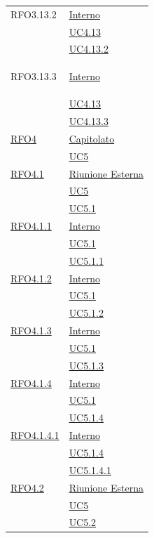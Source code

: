 \begin{longtable}{|>{\centering}m{5cm}|m{5cm}<{\centering}|}
\hypertarget{RFO3.13.2}{RFO3.13.2} & \hyperlink{Interno}{Interno}\\
&\hyperref[UC4.13]{UC4.13}\\
&\hyperref[UC4.13.2]{UC4.13.2}\\ \hline

\hypertarget{RFO3.13.3}{RFO3.13.3} & \hyperlink{Interno}{Interno}\\
&\hyperref[UC4.13]{UC4.13}\\
&\hyperref[UC4.13.3]{UC4.13.3}\\ \hline

\hyperlink{RFO4}{RFO4} & \hyperlink{Capitolato}{Capitolato}\\
& \hyperref[UC5]{UC5}\\ \hline

\hyperlink{RFO4.1}{RFO4.1} & \hyperlink{Riunione Esterna}{Riunione Esterna}\\
& \hyperref[UC5]{UC5}\\
& \hyperref[UC5.1]{UC5.1}\\ \hline

\hyperlink{RFO4.1.1}{RFO4.1.1} & \hyperlink{Interno}{Interno}\\
& \hyperref[UC5.1]{UC5.1}\\
& \hyperref[UC5.1.1]{UC5.1.1}\\ \hline

\hyperlink{RFO4.1.2}{RFO4.1.2} & \hyperlink{Interno}{Interno}\\
& \hyperref[UC5.1]{UC5.1}\\
& \hyperref[UC5.1.2]{UC5.1.2}\\ \hline

\hyperlink{RFO4.1.3}{RFO4.1.3} & \hyperlink{Interno}{Interno}\\
& \hyperref[UC5.1]{UC5.1}\\
& \hyperref[UC5.1.3]{UC5.1.3}\\ \hline

\hyperlink{RFO4.1.4}{RFO4.1.4} & \hyperlink{Interno}{Interno}\\
& \hyperref[UC5.1]{UC5.1}\\
& \hyperref[UC5.1.4]{UC5.1.4}\\ \hline

\hyperlink{RFO4.1.4.1}{RFO4.1.4.1} & \hyperlink{Interno}{Interno}\\
& \hyperref[UC5.1.4]{UC5.1.4}\\
& \hyperref[UC5.1.4.1]{UC5.1.4.1}\\ \hline

\hyperlink{RFO4.2}{RFO4.2} & \hyperlink{Riunione Esterna}{Riunione Esterna}\\
& \hyperref[UC5]{UC5}\\
& \hyperref[UC5.2]{UC5.2}\\ \hline


\end{longtable}
